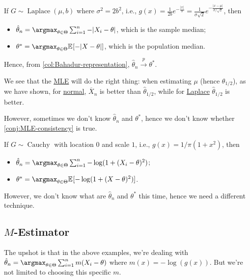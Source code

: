 \begin{eg}[Laplace]
	If \(G \sim \operatorname{Laplace} (\mu , b)\) where \(\sigma ^2 = 2b^2\), i.e., \(g(x) = \frac{1}{2b} e^{- \frac{\lvert x \rvert}{b}} = \frac{1}{\sigma \sqrt{2} } e^{- \frac{\lvert x - \mu \rvert }{\sigma / \sqrt{2} } }\), then
	\begin{itemize}
		\item \(\hat{\theta} _n = \argmax_{\theta \in \Theta } \sum_{i=1}^{n} - \lvert X_i - \theta \rvert\), which is the sample median;
		\item \(\theta ^{\ast} = \argmax_{\theta \in \Theta } \mathbb{E}_{}[- \lvert X - \theta  \rvert ] \), which is the population median.
	\end{itemize}
	Hence, from \autoref{col:Bahadur-representation}, \(\hat{\theta} _n \overset{p}{\to} \theta ^{\ast} \).
\end{eg}

\begin{remark}
	We see that the \hyperref[def:MLE]{MLE} will do the right thing: when estimating \(\mu \) (hence \(\theta _{1 / 2}\)), as we have shown, for \hyperref[eg:ARE-normal]{normal}, \(\overline{X} _n\) is better than \(\hat{\theta} _{1 / 2}\), while for \hyperref[eg:ARE-Laplace]{Laplace} \(\hat{\theta} _{1 / 2}\) is better.
\end{remark}

However, sometimes we don't know \(\hat{\theta} _n\) and \(\theta ^{\ast} \), hence we don't know whether \autoref{conj:MLE-consistency} is true.

\begin{eg}[Cauchy]\label{eg:MLE-Cauchy}
	If \(G \sim \operatorname{Cauchy} \) with location \(0\) and scale \(1\), i.e., \(g(x) = 1 / \pi (1 + x^2)\), then
	\begin{itemize}
		\item \(\hat{\theta} _n = \argmax_{\theta \in \Theta } \sum_{i=1}^{n} - \log (1 + (X_i - \theta )^2)\);
		\item \(\theta ^{\ast} = \argmax_{\theta \in \Theta } \mathbb{E}_{}[- \log (1 + (X - \theta )^2)] \).
	\end{itemize}
	However, we don't know what are \(\hat{\theta} _n\) and \(\theta ^{\ast} \) this time, hence we need a different technique.
\end{eg}

\subsection{\(M\)-Estimator}
The upshot is that in the above examples, we're dealing with \(\hat{\theta} _n = \argmax_{\theta \in \Theta } \sum_{i=1}^{n} m(X_i - \theta )\) where \(m(x) = - \log (g(x))\). But we're not limited to choosing this specific \(m\).

